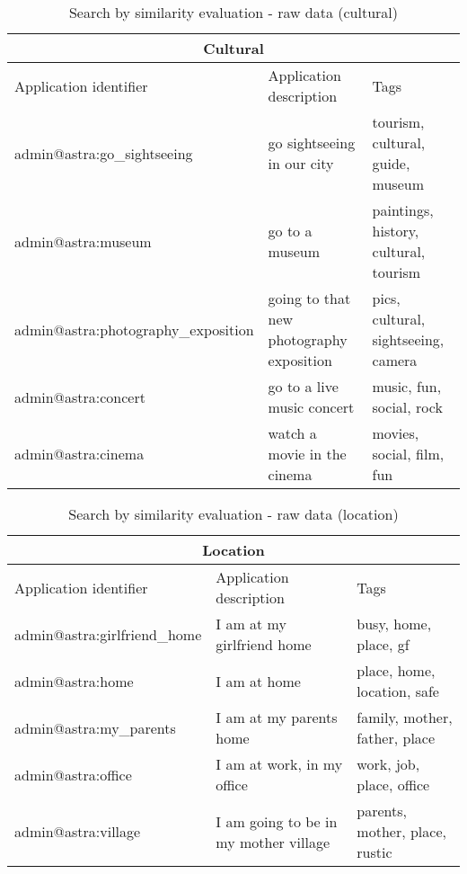 \begin{table}[h!]
	\tiny
    \begin{center}
		\begin{tabular}{||l|l|l||}

		\hline \hline
		\multicolumn{3}{||c||}{\bfseries{Cultural}} \\
		\hline \hline
			Application identifier & Application description & Tags \\
			\hline \hline
			admin@astra:go\_sightseeing & go sightseeing in our city & tourism, cultural,
			guide, museum\\
			\hline
			admin@astra:museum & go to a museum & paintings, history, cultural, tourism\\
			\hline
			admin@astra:photography\_exposition & going to that new photography
			exposition & pics, cultural, sightseeing, camera\\
			\hline
			admin@astra:concert & go to a live music concert & music, fun, social, rock\\
			\hline
			admin@astra:cinema & watch a movie in the cinema & movies, social, film,
			fun\\

		\hline \hline

		\end{tabular}
		\caption{\label{table:testing-data-cultural}Search by similarity evaluation -
		raw data (cultural)}
	\end{center}
\end{table} 

\begin{table}[h!]
	\tiny
    \begin{center}
		\begin{tabular}{||l|l|l||}

		\hline \hline
		\multicolumn{3}{||c||}{\bfseries{Location}} \\
		\hline \hline
			Application identifier & Application description & Tags \\
			\hline \hline
			admin@astra:girlfriend\_home & I am at my girlfriend home & busy, home,
			place, gf\\
			\hline
			admin@astra:home & I am at home	& place, home, location, safe\\
			\hline
			admin@astra:my\_parents & I am at my parents home & family, mother, father,
			place\\
			\hline
			admin@astra:office & I am at work, in my office & work, job, place, office\\
			\hline
			admin@astra:village & I am going to be in my mother village & parents,
			mother, place, rustic\\
		\hline \hline

		\end{tabular}
		\caption{\label{table:testing-data-location}Search by similarity evaluation -
		raw data (location)}
	\end{center}
\end{table} 

